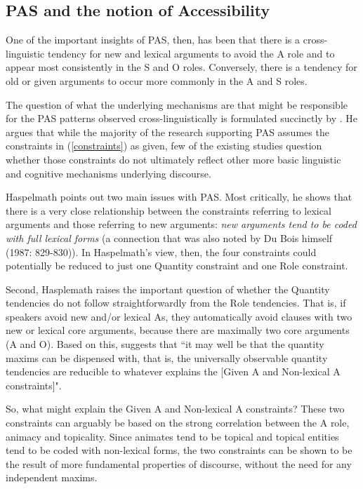 \subsection{PAS and the notion of Accessibility}\label{accessibilityandpas}

One of the important insights of PAS, then, has been that there is a cross-linguistic tendency for new and lexical arguments to avoid the A role and to appear most consistently in the S and O roles.  Conversely, there is a tendency for old or given arguments to occur more commonly in the A and S roles. 

The question of what the underlying mechanisms are that might be responsible for the PAS patterns observed cross-linguistically is formulated succinctly by \citet[910]{haspelmath2006}. He argues that while the majority of the research supporting PAS assumes the constraints in (\ref{constraints}) as given, few of the existing studies question whether those constraints do not ultimately reflect other more basic linguistic and cognitive mechanisms underlying discourse. 

Haspelmath points out two main issues with PAS. Most critically, he shows that there is a very close relationship between the constraints referring to lexical arguments and those referring to new arguments: \textit{new arguments tend to be coded with full lexical forms} (a connection that was also noted by Du Bois himself (1987: 829-830)). In Haspelmath's view, then, the four constraints could potentially be reduced to just one Quantity constraint and one Role constraint. 

Second, Hasplemath raises the important question of whether the Quantity tendencies do not follow straightforwardly from the Role tendencies. That is, if speakers avoid new and/or lexical As, they automatically avoid clauses with two new or lexical core arguments, because there are maximally two core arguments (A and O). Based on this, \citet[911]{haspelmath2006} suggests that ``it may well be that the quantity maxims can be dispensed with, that is, the universally observable quantity tendencies are reducible to whatever explains the [Given A and Non-lexical A constraints]". 

So, what might explain the Given A and Non-lexical A constraints? These two constraints can arguably be based on the strong correlation between the A role, animacy and topicality. Since animates tend to be topical and topical entities tend to be coded with non-lexical forms, the two constraints can be shown to be the result of more fundamental properties of discourse, without  the need for any independent maxims. 

